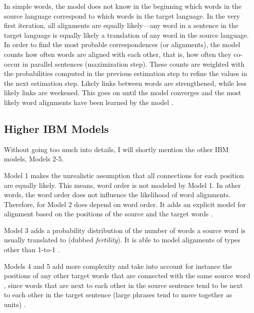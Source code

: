 In simple words, the model does not know in the beginning which words in the source language correspond to which words in the target language. 
In the very first iteration, all alignments are equally likely---any word in a sentence in the target language is equally likely a translation of any word in the source language.
In order to find the most probable correspondences (or alignments), the model counts how often words are aligned with each other, that is, how often they co-occur in parallel sentences (maximization step). 
These counts are weighted with the probabilities computed in the previous estimation step to refine the values in the next estimation step. 
Likely links between words are strengthened, while less likely links are weekened. 
This goes on until the model converges and the most likely word alignments have been learned by the model \autocites[88-92]{koehn2009}{brown-etal-1993-mathematics}. 

\subsection{Higher IBM Models}
Without going too much into details, I will shortly mention the other IBM models, Models 2-5. 

Model 1 makes the unrealistic assumption that all connections for each position are equally likely. 
This means, word order is not modeled by Model 1. 
In other words, the word order does not influence the likelihood of word alignments.
Therefore, for Model 2 does depend on word order. 
It adds an explicit model for alignment based on the positions of the source and the target words \autocites{brown-etal-1993-mathematics}[99]{koehn2009}.

Model 3 adds a probability distribution of the number of words a source word is usually translated to (dubbed \emph{fertility}). 
It is able to model alignments of types other than 1-to-1 \autocite[100]{koehn2009}. 

Models 4 and 5 add more complexity and take into account for instance the positions of any other target words that are connected with the same source word \autocite{brown-etal-1993-mathematics}, since words that are next to each other in the source sentence tend to be next to each other in the target sentence (large phrases tend to move together as units) \autocite[107]{koehn2009}.

